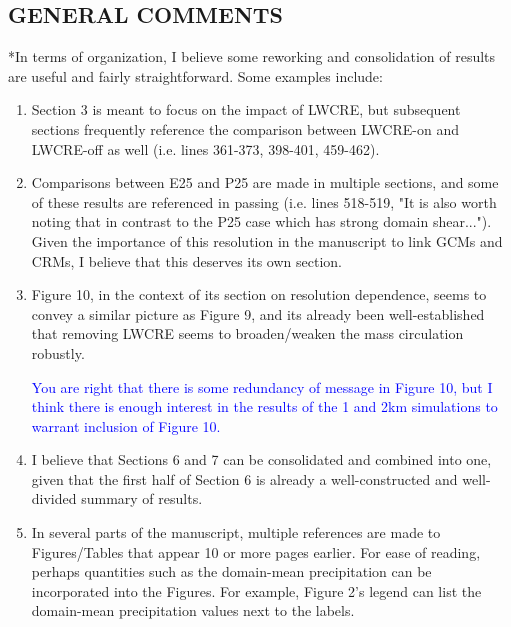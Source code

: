 \documentclass[draft]{agujournal2019}
\begin{document}
\subsection{GENERAL COMMENTS}
*In terms of organization, I believe some reworking and consolidation of results are useful and fairly straightforward. Some examples include:

\begin{enumerate}
  \item Section 3 is meant to focus on the impact of LWCRE, but subsequent sections frequently reference the comparison between LWCRE-on and LWCRE-off as well (i.e. lines 361-373, 398-401, 459-462).
  \item Comparisons between E25 and P25 are made in multiple sections, and some of these results are referenced in passing (i.e. lines 518-519, "It is also worth noting that in contrast to the P25 case which has strong domain shear..."). Given the importance of this resolution in the manuscript to link GCMs and CRMs, I believe that this deserves its own section.
  \item Figure 10, in the context of its section on resolution dependence, seems to convey a similar picture as Figure 9, and its already been well-established that removing LWCRE seems to broaden/weaken the mass circulation robustly.  
  
  \textcolor{blue}{You are right that there is some redundancy of message in Figure 10, but I think there is enough interest in the results of the 1 and 2km simulations to warrant inclusion of Figure 10. }
  
  \item I believe that Sections 6 and 7 can be consolidated and combined into one, given that the first half of Section 6 is already a well-constructed and well-divided summary of results.
  \item In several parts of the manuscript, multiple references are made to Figures/Tables that appear 10 or more pages earlier. For ease of reading, perhaps quantities such as the domain-mean precipitation can be incorporated into the Figures. For example, Figure 2's legend can list the domain-mean precipitation values next to the labels.
\end{enumerate}
\end{document}
